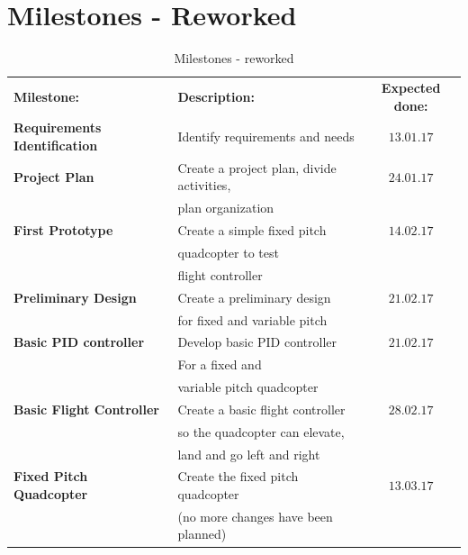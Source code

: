 \begin{table}[H]

\centering\section*{\textbf{Milestones - Reworked}}
\caption{Milestones - reworked}
\begin{tabular}{llc}
\rowcolor{cadetgrey}
\centering \textbf{Milestone:}    &\textbf{Description:} 	 &\textbf{Expected done:} \\ %

\rowcolor{gainsboro}
\textbf{Requirements Identification} & Identify requirements and needs & $13.01.17$ \\
\textbf{Project Plan} & Create a project plan, divide activities, & $24.01.17$ \\
                                     & plan organization & \\
\rowcolor{gainsboro}
\textbf{First Prototype} & Create a simple fixed pitch & $14.02.17$ \\\rowcolor{gainsboro}
                         & quadcopter to test & \\\rowcolor{gainsboro}
                         & flight controller & \\
\textbf{Preliminary Design} & Create a preliminary design & $21.02.17$ \\
                            & for fixed and variable pitch & \\\rowcolor{gainsboro}
\textbf{Basic PID controller} & Develop basic PID controller & $21.02.17$ \\\rowcolor{gainsboro}
                                 & For a fixed and & \\\rowcolor{gainsboro}
                                 & variable pitch quadcopter & \\
\textbf{Basic Flight Controller} & Create a basic flight controller & $28.02.17$ \\
                                 & so the quadcopter can elevate, & \\
                                 & land and go left and right & \\\rowcolor{gainsboro}
\textbf{Fixed Pitch Quadcopter} & Create the fixed pitch quadcopter & $13.03.17$ \\\rowcolor{gainsboro}
                                & (no more changes have been planned) & \\

\end{tabular}
\end{table}
